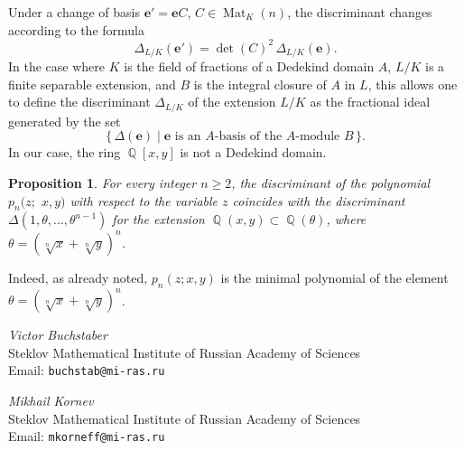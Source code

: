 \documentclass[14pt, dvipsnames]{extarticle}
\makeatletter
\theoremstyle{plain}
\newtheorem{prop}{Proposition}
\theoremstyle{definition}
\theoremstyle{remark}
\renewenvironment{proof}[1][\proofname]{
  \par\pushQED{\qed}\normalfont
  \topsep6\p@\@plus6\p@\relax
  \trivlist\item[\hskip\labelsep\bfseries\itshape #1\@addpunct{.}]
}{\popQED\endtrivlist\@endpefalse}
\DeclareMathOperator{\Q}{\mathbb{Q}}
\DeclareMathOperator{\Mat}{\mathrm{Mat}}
\makeatother
\begin{document}
Under a change of basis $\bm{e}' = \bm{e}C$, $C\in \Mat_K(n)$, the discriminant changes according to the formula
$$\Delta_{L/K}(\bm e')=\det(C)^{2}\,\Delta_{L/K}(\bm e).$$
In the case where $K$ is the field of fractions of a Dedekind domain $A$, $L/K$ is a finite separable extension, and $B$ is the integral closure of $A$ in $L$, this allows one to define the discriminant $\Delta_{L/K}$ of the extension $L/K$ as the fractional ideal generated by the set
$$\{\,\Delta(\bm e)\mid \text{$\bm e$ is an $A$-basis of the $A$-module $B$}\,\}.$$
In our case, the ring $\Q[x,y]$ is not a Dedekind domain.

\begin{prop}\label{p_n_as_field_extension_discriminant}
For every integer $n\ge 2$, the discriminant of the polynomial $p_n(z;$ $x, y)$ with respect to the variable $z$ coincides with the discriminant $\Delta(1,\theta,\dots,\theta^{n-1})$ for the extension $\Q(x,y)\subset \Q(\theta)$, where $\theta=(\sqrt[n]{x}+\sqrt[n]{y})^{n}$.
\end{prop}

\begin{proof}
Indeed, as already noted, $p_n(z; x, y)$ is the minimal polynomial of the element $\theta=(\sqrt[n]{x}+\sqrt[n]{y})^{n}$.
\end{proof}








































\newpage

\cleardoublepage

{}



\newpage

\vspace{1em}
\noindent
\textit{Victor Buchstaber}\\
Steklov Mathematical Institute of Russian Academy of Sciences\\
Email: \texttt{buchstab@mi-ras.ru}


\vspace{1em}
\noindent
\textit{Mikhail Kornev}\\
Steklov Mathematical Institute of Russian Academy of Sciences\\
Email: \texttt{mkorneff@mi-ras.ru}
\end{document}
